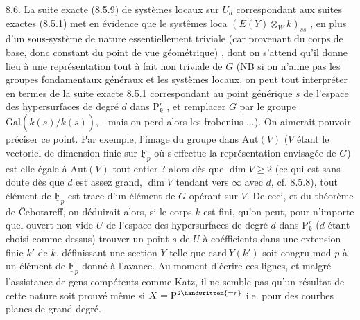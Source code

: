 %
8.6. La suite exacte (8.5.9) de systèmes locaux sur $U_d$ correspondant aux suites exactes (8.5.1) met en évidence que le systêmes loca   $(E(Y)\otimes_W k)_{ss}$ , en plus d'un sous-système   de nature essentiellement triviale (car provenant du corps de base, donc constant du point de vue géométrique)    , dont on s'attend qu'il donne lieu à une représentation tout à fait non triviale de $G$ (NB si on n'aime pas les groupes fondamentaux généraux et les systèmes locaux, on peut tout interpréter en termes de la suite exacte 8.5.1 correspondant au \uline{point générique} $s$ de l'espace des hypersurfaces de degré $d$ dans $\mathrm P^r_k$ , et remplacer $G$ par le groupe $\mathrm{Gal}(\overline{k(s)}/k(s))$, - mais on perd alors les frobenius ...). On aimerait pouvoir préciser ce point. Par exemple,  l'image du groupe   dans $\mathrm{Aut}(V)$ ($V$ étant le  vectoriel de dimension finie sur $\underline{\mathrm F}_p$ où s'effectue la représentation envisagée de $G$) est-elle égale à $\mathrm{Aut}(V)$ tout entier ?   alors dès que  $\dim V\geq2$ (ce qui est sans doute  dès que $d$ est assez grand, $\dim V$ tendant vers $\infty$ avec $d$, cf. 8.5.8), tout élément de $\underline{\mathrm F}_p$ est trace d'un élément de $G$ opérant sur $V$. De ceci,  et du théorème de Čebotareff, on déduirait alors, \handwritten{(}si le corps $k$ est fini\unsure{)}, qu'on peut, pour n'importe quel ouvert non vide $U$ de l'espace des hypersurfaces de degré $d$ dans $\mathrm P^r_k$ ($d$ étant choisi comme dessus) trouver un point  $s$ de $U$ à coéfficients dans une extension finie $k'$ de $k$, définissant une section $Y$ telle que $\mathrm{card}\,Y(k')$ soit congru mod $p$ à un élément de $\underline{\mathrm F}_p$ donné à l'avance. Au moment d'écrire ces lignes, et malgré l'assistance de gens compétents comme Katz, il ne semble pas qu'un résultat de cette nature soit prouvé\deleted{,}\handwritten{(} même si $X=\mathrm P^{2\handwritten{=r}}$ i.e. pour des courbes planes  de grand degré\handwritten{)}. 


